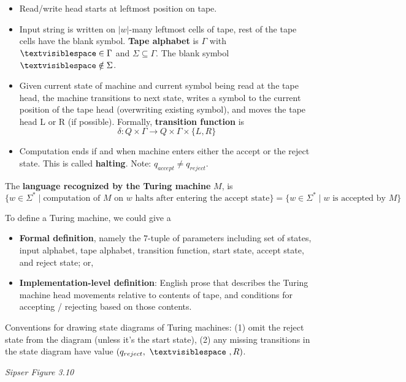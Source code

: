 \documentclass[12pt, oneside]{article}
\begin{document}
\begin{itemize}
\setlength{\itemsep}{0pt}
\item Read/write head starts at leftmost position on tape. 
\item Input string is written on $|w|$-many leftmost cells of tape, 
rest of  the tape cells have  the blank symbol. {\bf Tape alphabet} 
is $\Gamma$ with $\textvisiblespace\in \Gamma$ and $\Sigma \subseteq \Gamma$.
The blank symbol $\textvisiblespace \notin \Sigma$.
\item Given current state of machine and current symbol being read at the tape head, 
the machine transitions to next state, writes a symbol to the current position  of the 
tape  head (overwriting existing symbol), and moves the tape head L or R (if possible). 
Formally, {\bf transition function}  is 
\[
  \delta: Q\times \Gamma \to Q \times \Gamma \times \{L, R\}
\]
\item Computation ends if and when machine enters either the accept or the reject state.
This is called {\bf halting}.
Note: $q_{accept} \neq q_{reject}$.
\end{itemize}

The {\bf language recognized by the  Turing machine} $M$,  is  
\[
  \{ w \in \Sigma^* \mid \textrm{computation of $M$ on $w$ halts after entering the accept state}\} = \{ w \in \Sigma^* \mid w \textrm{ is accepted by } M\}
\]
  
To define a Turing machine, we could give a 
\begin{itemize}
\item {\bf Formal definition}, namely the $7$-tuple of parameters including set of states, 
input alphabet, tape alphabet, transition function, start state, accept state, and reject state; or,
\item {\bf Implementation-level definition}: English prose that describes the Turing machine head 
movements relative to contents of tape, and conditions for accepting / rejecting based on those contents.
\end{itemize}

Conventions for drawing state diagrams of Turing machines: (1) omit the reject state from the diagram (unless 
it's the  start state), (2) any missing transitions in the state diagram have value $(q_{reject}, ~\textvisiblespace~ , R)$.


\newpage
{\it Sipser Figure  3.10}
\end{document}
